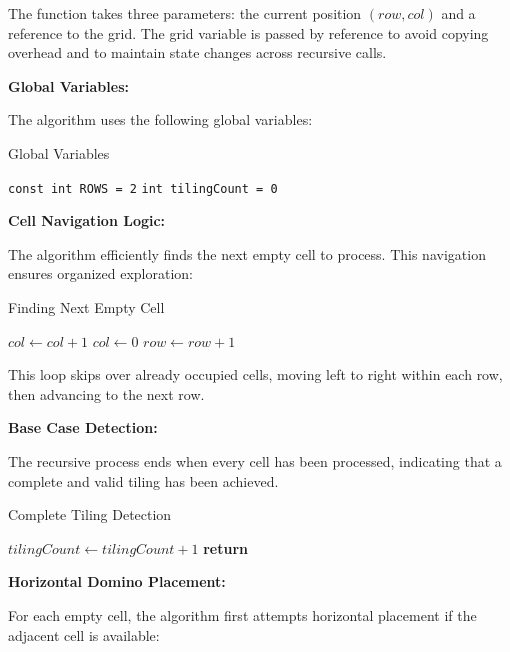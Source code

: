 \documentclass[conference]{IEEEtran}
\begin{document}
The function takes three parameters: the current position $(row, col)$ and a reference to the grid. The grid variable is passed by reference to avoid copying overhead and to maintain state changes across recursive calls.

\textbf{Global Variables:}

The algorithm uses the following global variables:

\begin{algorithm}[htbp]
\caption{Global Variables}
\begin{algorithmic}[1]
\State \texttt{const int ROWS = 2} 
\State \texttt{int tilingCount = 0} 
\end{algorithmic}
\end{algorithm}

\textbf{Cell Navigation Logic:}

The algorithm efficiently finds the next empty cell to process. This navigation ensures organized exploration:

\begin{algorithm}[htbp]
\caption{Finding Next Empty Cell}
\begin{algorithmic}[1]
    \State $col \gets col + 1$
        \State $col \gets 0$
        \State $row \gets row + 1$
    \EndIf
\EndWhile
\end{algorithmic}
\end{algorithm}

This loop skips over already occupied cells, moving left to right within each row, then advancing to the next row.

\textbf{Base Case Detection:}

The recursive process ends when every cell has been processed, indicating that a complete and valid tiling has been achieved.

\begin{algorithm}[htbp]
\caption{Complete Tiling Detection}
\begin{algorithmic}[1]
    \State $tilingCount \gets tilingCount + 1$
    \State \textbf{return}
\EndIf
\end{algorithmic}
\end{algorithm}

\textbf{Horizontal Domino Placement:}

For each empty cell, the algorithm first attempts horizontal placement if the adjacent cell is available:
\end{document}
